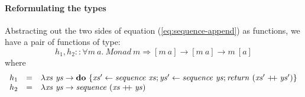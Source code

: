 \documentclass{llncs}
\newcommand{\listappend}{\mathrel{+\kern-3pt+}}
\begin{document}
\paragraph{Reformulating the types} Abstracting out the two sides of
equation (\ref{eq:sequence-append}) as functions, we have a pair of
functions of type:
\begin{displaymath}
  h_1, h_2 :: \forall m~a.~\mathit{Monad}~m \Rightarrow [m~a] \to [m~a] \to m~[a]
\end{displaymath}
where
\begin{displaymath}
  \begin{array}{lcl}
    h_1&=&\lambda \mathit{xs}~\mathit{ys} \to \mathbf{do}~\{\mathit{xs'} \leftarrow \mathit{sequence}~\mathit{xs}; \mathit{ys'} \leftarrow \mathit{sequence}~\mathit{ys}; \mathit{return}~(\mathit{xs'}\listappend\mathit{ys'}) \} \\
    h_2&=&\lambda \mathit{xs}~\mathit{ys} \to \mathit{sequence}~(\mathit{xs}\listappend\mathit{ys})
  \end{array}
\end{displaymath}

\end{document}
